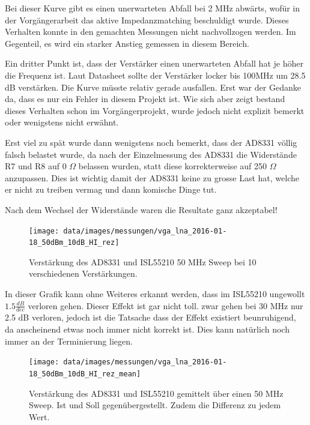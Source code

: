 Bei dieser Kurve gibt es einen unerwarteten Abfall bei 2 MHz abwärts, wofür in der Vorgängerarbeit das aktive Impedanzmatching beschuldigt wurde. Dieses Verhalten konnte in den gemachten Messungen nicht nachvollzogen werden. Im Gegenteil, es wird ein starker Anstieg gemessen in diesem Bereich.

Ein dritter Punkt ist, dass der Verstärker einen unerwarteten Abfall hat je höher die Frequenz ist. Laut Datasheet sollte der Verstärker locker bis 100MHz um 28.5 dB verstärken. Die Kurve müsste relativ gerade ausfallen. Erst war der Gedanke da, dass es nur ein Fehler in diesem Projekt ist. Wie sich aber zeigt bestand dieses Verhalten schon im Vorgängerprojekt, wurde jedoch nicht explizit bemerkt oder wenigstens nicht erwähnt.

Erst viel zu spät wurde dann wenigstens noch bemerkt, dass der AD8331 völlig falsch belastet wurde, da nach der Einzelmessung des AD8331 die Widerstände R7 und R8 auf 0 $\Omega$ belassen wurden, statt diese korrekterweise auf 250 $\Omega$ anzupassen. Dies ist wichtig damit der AD8331 keine zu grosse Last hat, welche er nicht zu treiben vermag und dann komische Dinge tut.

Nach dem Wechsel der Widerstände waren die Resultate ganz akzeptabel!

\begin{figure}[H]
\begin{center}
    \texttt{[image: data/images/messungen/vga\_lna\_2016-01-18\_50dBm\_10dB\_HI\_rez]}
    \caption{Verstärkung des AD8331 und ISL55210 50 MHz Sweep bei 10 verschiedenen Verstärkungen.}
    \label{fig:T_fixed_ISL55210}
\end{center}
\end{figure}

In dieser Grafik kann ohne Weiteres erkannt werden, dass im ISL55210 ungewollt $1.5 \frac{dB}{dec}$ verloren gehen. Dieser Effekt ist gar nicht toll. zwar gehen bei 30 MHz nur 2.5 dB verloren, jedoch ist die Tatsache dass der Effekt existiert beunruhigend, da anscheinend etwas noch immer nicht korrekt ist. Dies kann natürlich noch immer an der Terminierung liegen.

\begin{figure}[H]
\begin{center}
    \texttt{[image: data/images/messungen/vga\_lna\_2016-01-18\_50dBm\_10dB\_HI\_rez\_mean]}
    \caption{Verstärkung des AD8331 und ISL55210 gemittelt über einen 50 MHz Sweep. Ist und Soll gegenübergestellt. Zudem die Differenz zu jedem Wert.}
    \label{fig:T_fixed_mean_ISL55210}
\end{center}
\end{figure}

